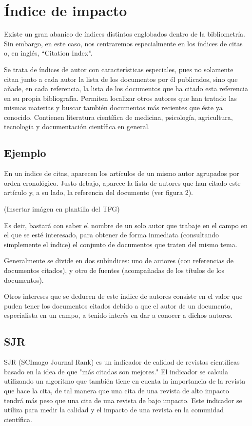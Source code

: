 \section{Índice de impacto}

Existe un gran abanico de índices distintos englobados dentro de la bibliometría. Sin embargo, en este caso, nos centraremos especialmente en los índices de citas o, en inglés, ``Citation Index''.

Se trata de índices de autor con características especiales, pues no solamente citan junto a cada autor la lista de los documentos por él publicados, sino
que añade, en cada referencia, la lista de los documentos que ha citado esta referencia en su propia bibliografía. Permiten localizar otros autores que han tratado las mismas materias y buscar también documentos más recientes que éste ya conocido.
Contienen literatura científica de medicina, psicología, agricultura, tecnología y documentación científica en general. 


\subsection{Ejemplo}

En un índice de citas, aparecen los artículos de un mismo autor agrupados por orden cronológico. Justo debajo, aparece la lista de autores que han citado este artículo y,
a su lado, la referencia del documento (ver figura 2).

	(Insertar imágen en plantilla del TFG)

Es deir, bastará con saber el nombre de un solo autor que trabaje en el campo en el que se esté interesado, para obtener de forma inmediata (consultando simplemente el índice) el conjunto de documentos que traten del mismo tema.

Generalmente se divide en dos subíndices: uno de autores (con referencias de documentos citados), y otro de fuentes (acompañadas de los títulos de los documentos).

Otros intereses que se deducen de este índice de autores consiste en el valor que puden  tener los documentos citados debido a que el autor de un documento, especialista en un campo, a tenido interés en dar a conocer a dichos autores.


\subsection{SJR}

SJR (SCImago Journal Rank) es un indicador de calidad de revistas científicas basado en la idea de que "más citadas son mejores." El indicador se calcula utilizando un algoritmo que también tiene en cuenta la importancia de la revista que hace la cita, de tal manera que una cita de una revista de alto impacto tendrá más peso que una cita de una revista de bajo impacto. Este indicador se utiliza para medir la calidad y el impacto de una revista en la comunidad científica.


